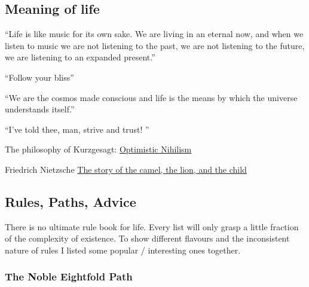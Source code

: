 \documentclass{article}
\begin{document}
\subsection{Meaning of life}

\vspace{1cm}
{``Life is like music for its own sake. We are living in an eternal now, and when we listen to music we are not listening to the past, we are not listening to the future, we are listening to an expanded present.''
\\[5pt]
}

\vspace{1cm}
{``Follow your bliss''
\\[5pt]
}

\vspace{1cm}
{``We are the cosmos made conscious and life is the means by which the universe understands itself.''
\\[5pt]
}

\vspace{1cm}
{``I've told thee, man, strive and trust! ''
\\[5pt]
}

The philosophy of Kurzgesagt: \href{https://www.youtube.com/watch?v=MBRqu0YOH14}{Optimistic Nihilism}

Friedrich Nietzsche
\href{https://medium.com/the-sophist/nietzsches-three-steps-to-a-meaningful-life-f063793adfc4}{The story of the camel, the lion, and the child}

\subsection{Rules, Paths, Advice}

There is no ultimate rule book for life. Every list will only grasp a little fraction of the complexity of existence. To show different flavours and the inconsistent nature of rules I listed some popular / interesting ones together.



\subsubsection{The Noble Eightfold Path}
\end{document}
